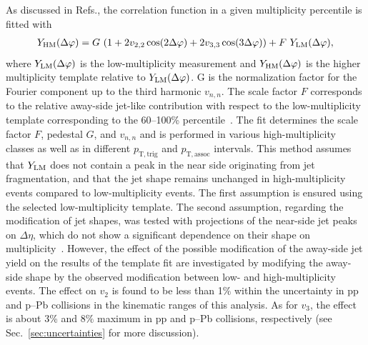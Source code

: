As discussed in Refs.\cite{ATLAS:2015hzw,ATLAS:2016yzd}, the correlation function in a given multiplicity percentile is fitted with 
\begin{eqnarray}
\label{eq:narray}
Y_{\rm{HM}}(\Delta\varphi) = G~(1 + 2v_{2,2}\cos(2\Delta\varphi) + 2v_{3,3}\cos(3\Delta\varphi)) + F~Y_{\rm{LM}}(\Delta\varphi),
\end{eqnarray}
where $Y_{\rm{LM}}(\Delta\varphi)$ is the low-multiplicity measurement and $Y_{\rm{HM}}(\Delta\varphi)$ is the higher multiplicity template relative to $Y_{\rm{LM}}(\Delta\varphi)$. G is the normalization factor for the Fourier component up to the third harmonic $v_{n,n}$. The scale factor $F$ corresponds to the relative away-side jet-like contribution with respect to the low-multiplicity template corresponding to the 60--100\% percentile~\cite{ALICE:2013tla,ALICE:2014mas}. 
The fit determines the scale factor $F$, pedestal $G$, and $v_{n,n}$ and is performed in various high-multiplicity classes as well as in different $p_\mathrm{T,trig}$ and $p_\mathrm{T,assoc}$ intervals. 
This method assumes that $Y_{\rm{LM}}$ does not contain a peak in the near side originating from jet fragmentation, and that the jet shape remains unchanged in high-multiplicity events compared to low-multiplicity events. The first assumption is ensured using the selected low-multiplicity template. The second assumption, regarding the modification of jet shapes, was tested with projections of the near-side jet peaks on $\Delta\eta$, which do not show a significant dependence on their shape on multiplicity~\cite{LAKOMOV2017329}. However, the effect of the possible modification of the away-side jet yield on the results of the template fit are investigated by modifying the away-side shape by the observed modification between low- and high-multiplicity events. The effect on $v_2$ is found to be less than 1$\%$ within the uncertainty in pp and p--Pb collisions in the kinematic ranges of this analysis. As for $v_3$, the effect is about 3\% and 8$\%$ maximum in pp and p--Pb collisions, respectively (see Sec.~\ref{sec:uncertainties} for more discussion).

